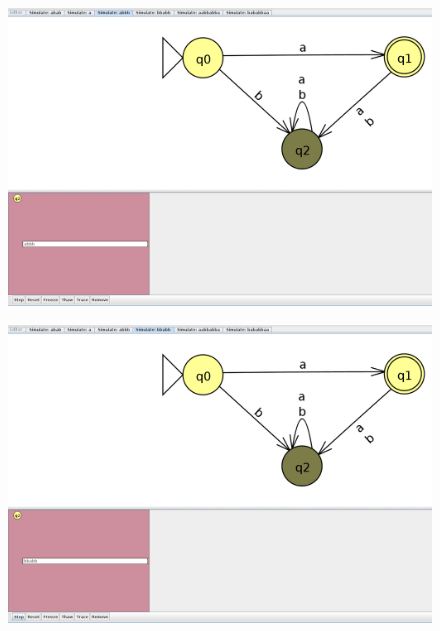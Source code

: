\documentclass[11pt]{article}
\begin{document}
\begin{figure}[]
\centering
\includegraphics[scale=0.2]{images/Cadena3.png}
\label{}
\\
\end{figure}

\begin{figure}[]
\centering
\includegraphics[scale=0.2]{images/Cadena4.png}
\label{}
\\
\end{figure}
\end{document}
